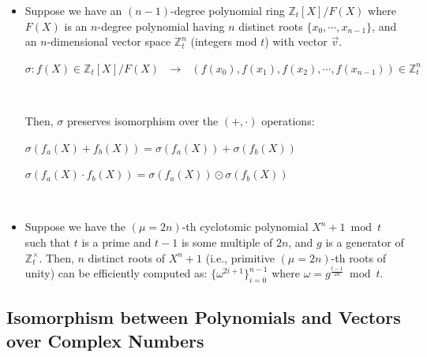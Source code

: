 \begin{tcolorbox}[title={\textbf{\tboxtheorem{\ref*{subsubsec:poly-vector-transformation-modulus}} Isomorphism between Polynomials and Vectors over Integers (Ring)}}]

\begin{itemize}
\item Suppose we have an $(n-1)$-degree polynomial ring $\mathbb{Z}_t[X] / F(X)$ where $F(X)$ is an $n$-degree polynomial having $n$ distinct roots $\{x_0, \cdots, x_{n-1}\}$, and an $n$-dimensional vector space $\mathbb{Z}_t^n$ (integers mod $t$) with vector $\vec{v}$.

$\sigma: f(X) \in \mathbb{Z}_t[X] / F(X) \text{ } \longrightarrow \text{ } (f(x_0), f(x_1), f(x_2), \cdots, f(x_{n-1})) \in \mathbb{Z}_t^n$

$ $

Then, $\sigma$ preserves isomorphism over the $(+, \cdot)$ operations:


$\sigma(f_a(X) + f_b(X)) = \sigma(f_a(X)) + \sigma(f_b(X))$

$\sigma(f_a(X) \cdot f_b(X)) = \sigma(f_a(X)) \odot \sigma(f_b(X))$

$ $




\item Suppose we have the $(\mu=2n)$-th cyclotomic polynomial $X^n + 1 \bmod t$ such that $t$ is a prime and $t - 1$ is some multiple of $2n$, and $g$ is a generator of $\mathbb{Z}_t^{\times}$. Then, $n$ distinct roots of $X^n + 1$ (i.e., primitive $(\mu=2n)$-th roots of unity) can be efficiently computed as: $\{\omega^{2i + 1}\}_{i=0}^{n-1}$ where $\omega = g^{\frac{t-1}{2n}} \bmod t$. 


\end{itemize}
\end{tcolorbox}





\subsection{Isomorphism between Polynomials and Vectors over Complex Numbers}
\label{subsec:poly-vector-transformation-complex}



